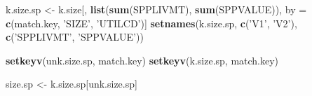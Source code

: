 \documentclass[]{article}
\newenvironment{Shaded}{\begin{snugshade}}{\end{snugshade}}
\newcommand{\KeywordTok}[1]{\textcolor[rgb]{0.13,0.29,0.53}{\textbf{#1}}}
\newcommand{\StringTok}[1]{\textcolor[rgb]{0.31,0.60,0.02}{#1}}
\newcommand{\NormalTok}[1]{#1}
\begin{document}
\begin{Shaded}
\begin{Highlighting}[]
\NormalTok{  k.size.sp <-}\StringTok{ }\NormalTok{k.size[, }\KeywordTok{list}\NormalTok{(}\KeywordTok{sum}\NormalTok{(SPPLIVMT), }\KeywordTok{sum}\NormalTok{(SPPVALUE)), }
\NormalTok{                      by =}\StringTok{ }\KeywordTok{c}\NormalTok{(match.key, }\StringTok{'SIZE'}\NormalTok{, }\StringTok{'UTILCD'}\NormalTok{)]}
  \KeywordTok{setnames}\NormalTok{(k.size.sp, }\KeywordTok{c}\NormalTok{(}\StringTok{'V1'}\NormalTok{, }\StringTok{'V2'}\NormalTok{), }\KeywordTok{c}\NormalTok{(}\StringTok{'SPPLIVMT'}\NormalTok{, }\StringTok{'SPPVALUE'}\NormalTok{))}
  
  \KeywordTok{setkeyv}\NormalTok{(unk.size.sp, match.key)}
  \KeywordTok{setkeyv}\NormalTok{(k.size.sp,   match.key)}
  
\NormalTok{  size.sp <-}\StringTok{ }\NormalTok{k.size.sp[unk.size.sp]}
  

\end{Highlighting}
\end{Shaded}
\end{document}
